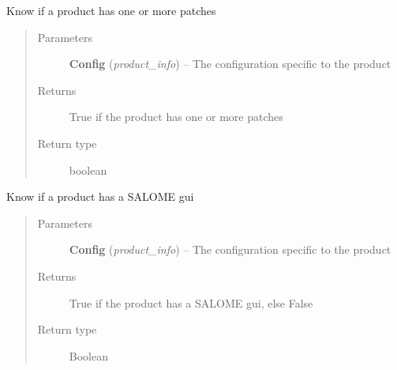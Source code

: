 \documentclass[a4paper,10pt,english]{sphinxmanual}
\begin{document}
\begin{fulllineitems}
\label{commands/apidoc/src:src.product.product_has_patches}
Know if a product has one or more patches
\begin{quote}\begin{description}
\item[{Parameters}] \leavevmode
\textbf{Config} (\emph{product\_info}) -- The configuration specific to 
the product

\item[{Returns}] \leavevmode
True if the product has one or more patches

\item[{Return type}] \leavevmode
boolean

\end{description}\end{quote}

\end{fulllineitems}


\begin{fulllineitems}
\label{commands/apidoc/src:src.product.product_has_salome_gui}
Know if a product has a SALOME gui
\begin{quote}\begin{description}
\item[{Parameters}] \leavevmode
\textbf{Config} (\emph{product\_info}) -- The configuration specific to 
the product

\item[{Returns}] \leavevmode
True if the product has a SALOME gui, else False

\item[{Return type}] \leavevmode
Boolean

\end{description}\end{quote}

\end{fulllineitems}

\end{document}
